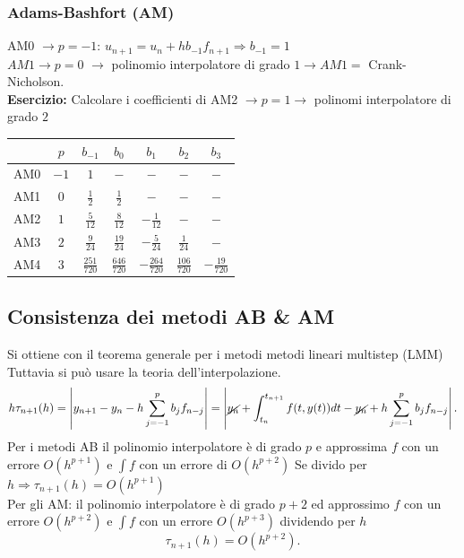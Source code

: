 \documentclass[12px]{article}
\begin{document}
\subsubsection{Adams-Bashfort (AM)}
AM0 $ \rightarrow p = -1$: $u_{n+1} = u_n + h b_{-1}f_{n+1} \Rightarrow  b_{-1} = 1$ \\
$AM1 \rightarrow p= 0$  $ \rightarrow $ polinomio interpolatore di grado $1 \rightarrow AM 1 = $   Crank-Nicholson.\\
\textbf{Esercizio:} Calcolare i coefficienti di AM2 $ \rightarrow p=1 \rightarrow$   polinomi interpolatore di grado $2$\\
\begin{table}[h]
\centering
\renewcommand{\arraystretch}{1.5} %
\begin{tabular}{|c|c|c|c|c|c|c|}
\hline
    & $p$  & $b_{-1}$          & $b_0$             & $b_1$              & $b_2$             & $b_3$             \\ \hline
AM0 & $-1$ & $1$               & $-$               & $-$                & $-$               & $-$               \\ \hline
AM1 & $0$  & $\frac{1}{2}$     & $\frac{1}{2}$     & $-$                & $-$               & $-$               \\ \hline
AM2 & $1$  & $\frac{5}{12}$    & $\frac{8}{12}$    & $-\frac{1}{12}$    & $-$               & $-$               \\ \hline
AM3 & $2$  & $\frac{9}{24}$    & $\frac{19}{24}$   & $-\frac{5}{24}$    & $\frac{1}{24}$    & $-$               \\ \hline
AM4 & $3$  & $\frac{251}{720}$ & $\frac{646}{720}$ & $-\frac{264}{720}$ & $\frac{106}{720}$ & $-\frac{19}{720}$ \\ \hline
\end{tabular}
\end{table}
\subsection{Consistenza dei metodi AB \& AM}
Si ottiene con il teorema generale per i metodi metodi lineari multistep (LMM)\\
Tuttavia si può usare la teoria dell'interpolazione.
\[
	h\tau_{n+1}(h) = \left|y_{n+1} - y_n - h \sum^{p}_{j=-1}b_jf_{n-j}\right| = \left| \cancel{y_n} + \int_{t_n}^{t_{n+1}}f(t,y(t))dt - \cancel{y_n} + h \sum^{p}_{j=-1}b_jf_{n-j}\right|
.\] 
Per i metodi AB il polinomio interpolatore è di grado $p$ e approssima $f$ con un errore $O(h^{p+1} )$ e $\int f$ con un errore di  $O(h^{p+2})$ Se divido per  $h \Rightarrow  \tau_{n+1}(h) = O(h^{p+1})$ \\
Per gli AM: il polinomio interpolatore è di grado $p+2$ ed approssimo $f $ con un errore $O(h^{p+2})$ e $\int f$ con un errore $O(h^{p+3})$ dividendo per  $h$ 
 \[
	 \tau_{n+1}(h) = O(h^{p+2})
.\] 
\end{document}
